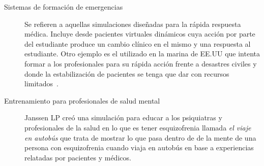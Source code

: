 \begin{description}
\item[Sistemas de formación de emergencias] Se refieren a aquellas simulaciones
	diseñadas para la rápida respuesta médica. Incluye desde pacientes
	virtuales dinámicos cuya acción por parte del estudiante produce un
	cambio clínico en el mismo y una respuesta al estudiante.  Otro ejemplo
	es el utilizado en la marina de EE.UU que intenta formar a los
	profesionales para su rápida acción frente a desastres civiles y donde
	la estabilización de pacientes se tenga que dar con recursos
	limitados~\cite{mantovani:vr}. 

\item[Entrenamiento para profesionales de salud mental] Janssen LP creó una
	simulación para educar a los psiquiatras y profesionales de la salud en
	lo que es tener esquizofrenia llamada \emph{el viaje en autobús} que
	trata de mostrar lo que pasa dentro de de la mente de una persona con
	esquizofrenia cuando viaja en autobús en base a experiencias relatadas
	por pacientes y médicos\cite{mantovani:vr}. 

\end{description}
